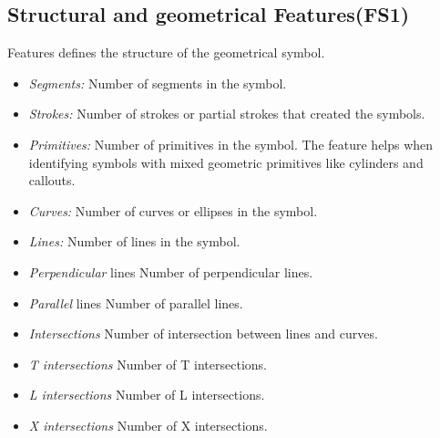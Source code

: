 \subsection{Structural and geometrical Features(FS1)}
Features defines the structure of the geometrical symbol.  
  \begin{itemize}
	 \item \emph{Segments:} Number of segments in the symbol.
	 \item \emph{Strokes:} Number of strokes or partial strokes that created the symbols.  
		\item  \emph{Primitives:} Number of primitives in the symbol. The feature helps when identifying             symbols with mixed geometric primitives like cylinders and callouts.  
		\item \emph{Curves:} Number of curves or ellipses in the symbol. 
		\item \emph{Lines:} Number of lines in the symbol. 
		\item \emph{Perpendicular} lines Number of perpendicular lines. 
		\item \emph{Parallel} lines Number of parallel lines. 
		\item \emph{Intersections} Number of intersection between lines and curves. 
		\item \emph{T intersections} Number of T intersections. 
		\item \emph{L intersections} Number of L intersections. 
		\item \emph{X intersections} Number of X intersections.
	
\end{itemize}
%		
%		
%

